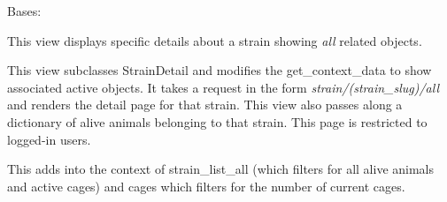 \documentclass[letterpaper,10pt,english]{sphinxmanual}
\begin{document}

\begin{fulllineitems}
\label{api:mousedb.animal.views.StrainDetailAll}
Bases: {\hyperref[api:mousedb.animal.views.StrainDetail]{}}

This view displays specific details about a strain showing \emph{all} related objects.

This view subclasses StrainDetail and modifies the get\_context\_data to show associated active objects.
It takes a request in the form \emph{strain/(strain\_slug)/all} and renders the detail page for that strain.
This view also passes along a dictionary of alive animals belonging to that strain.
This page is restricted to logged-in users.


\begin{fulllineitems}
\label{api:mousedb.animal.views.StrainDetailAll.get_context_data}
This adds into the context of strain\_list\_all (which filters for all alive animals and active cages) and cages which filters for the number of current cages.

\end{fulllineitems}


\end{fulllineitems}


\end{document}
